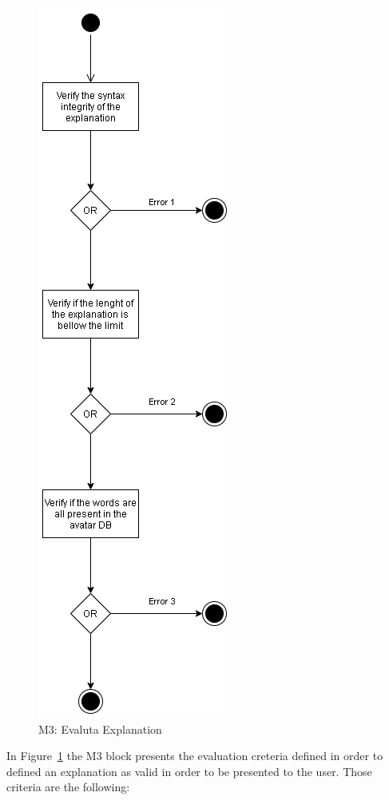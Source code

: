 \begin{figure}[H]
\centering
\includegraphics[scale=0.5]{ch4/assets/M3.png}
\caption[Evaluate Explanation Module]{M3: Evaluta Explanation}
\label{fig:M3}
\end{figure}

In Figure~\ref{fig:M3} the M3 block presents the evaluation creteria defined in order to defined an explanation as valid in order to be presented to the user.
Those criteria are the following:

